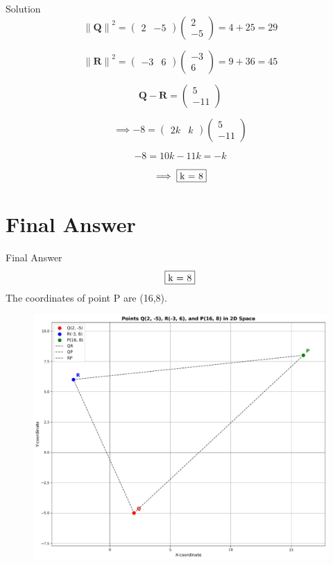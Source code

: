 \documentclass{beamer}
\let\vec\mathbf
\theoremstyle{remark}
\providecommand{\norm}[1]{\lVert#1\rVert}
\newcommand{\myvec}[1]{\ensuremath{\begin{pmatrix}#1\end{pmatrix}}}
\begin{document}
\begin{frame}{Solution}
\begin{equation}
    {\norm{\vec{Q}}}^2 = \myvec{2&-5}\myvec{2\\-5} = 4+25 = 29
\end{equation}

\begin{equation}
    {\norm{\vec{R}}}^2 = \myvec{-3&6}\myvec{-3\\6} = 9+36 = 45
\end{equation}

\begin{equation}
    \vec{Q} - \vec{R} = \myvec{5\\-11}
\end{equation}

\begin{equation}
    \implies -8 = \myvec{2k&k}\myvec{5\\-11}
\end{equation}

\begin{equation}
    -8 = 10k - 11k = -k
\end{equation}

\begin{equation}
    \implies \fbox{k = 8}
\end{equation}

\end{frame}

\section{Final Answer}
\begin{frame}{Final Answer}
\begin{equation*}
    \fbox{k = 8}
\end{equation*}
The coordinates of point P are (16,8).

\begin{figure}
    \centering
    \includegraphics[width=0.5\linewidth]{figs/1.jpg}
\end{figure}

\end{frame}
\end{document}
